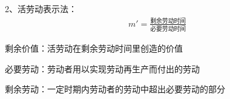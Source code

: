 \documentclass[12pt]{book}
\begin{document}
2、活劳动表示法：
\begin{gather*}
    m'=\frac{\text{剩余劳动时间}}{\text{必要劳动时间}}
\end{gather*}
\par 剩余价值：活劳动在剩余劳动时间里创造的价值  
\par 必要劳动：劳动者用以实现劳动再生产而付出的劳动  
\par 剩余劳动：一定时期内劳动者的劳动中超出必要劳动的部分









\end{document}
